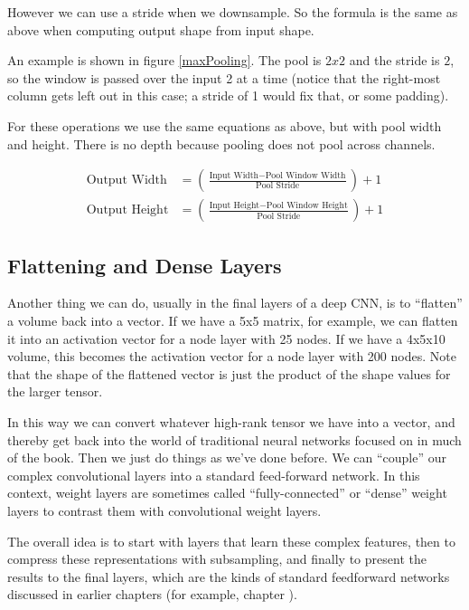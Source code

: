 However we can use a stride when we downsample. So the formula is the same as above when computing output shape from input shape.

An example is shown in figure \ref{maxPooling}. The pool is $2 x 2$ and the stride is $2$, so the window is passed over the input 2 at a time (notice that the right-most column gets left out in this case; a stride of 1 would fix that, or some padding). 

For these operations we use the same equations as above, but with pool width and height. There is no depth because pooling does not pool across channels.

\begin{align*}
\text{Output Width} &= \left( \frac{\text{Input Width} - \text{Pool Window Width}}{\text{Pool Stride}} \right) + 1 \\
\text{Output Height} &= \left( \frac{\text{Input Height} - \text{Pool Window Height}}{\text{Pool Stride}} \right) + 1
\end{align*} 

\subsection{Flattening and Dense Layers}

Another thing we can do, usually in the final layers of a deep CNN, is to ``flatten'' a volume back into a vector. If we have a 5x5 matrix, for example, we can flatten it into an activation vector for a node layer with 25 nodes. If we have a 4x5x10 volume, this becomes the activation vector for a node layer with 200 nodes.  Note that the shape of the flattened vector is just the product of the shape values for the larger tensor.  

In this way we can convert whatever high-rank tensor we have into a vector, and thereby get back into the world of  traditional neural networks focused on in much of the book.  Then we just do things as we've done before.  We can ``couple'' our complex convolutional layers into a standard feed-forward network.  In this context, weight layers are sometimes called ``fully-connected'' or ``dense'' weight layers to contrast them with convolutional weight layers.
	
The overall idea is to start with layers that learn these complex features, then to compress these representations with subsampling, and finally to present the results to the final layers, which are the kinds of standard feedforward networks discussed in earlier chapters (for example, chapter ).

